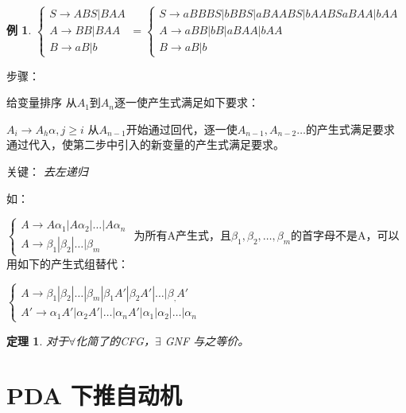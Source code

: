 \documentclass[twocolumn,zihao=5,linespread=1,heading=false,autoindent=0pt]{ctexart}
\theoremstyle{exampstyle} \newtheorem{definition}{定义}[section]
\theoremstyle{exampstyle} \newtheorem{example}{例}[section]
\theoremstyle{exampstyle} \newtheorem{theorem}{定理}[section]
\theoremstyle{exampstyle} \newtheorem{lemma}{引理}[section]
\theoremstyle{exampstyle} \newtheorem{myproof}{证明}[section]
\begin{document}
\begin{example}
    $
        \begin{cases}
            S \to ABS | BAA \\
            A \to BB | BAA \\
            B \to aB | b
        \end{cases} = \begin{cases}
            S \to aBBBS | bBBS | aBAABS | bAABS 
                    aBAA | bAA\\
            A \to aBB | bB | aBAA | bAA \\
            B \to aB | b
        \end{cases}
    $
\end{example}

步骤：
\begin{outline}[cenumerate]
    \1 给变量排序
    \1 从$A_1$到$A_n$逐一使产生式满足如下要求：

    $A_i \to A_h \alpha, j \ge i$
    \1 从$A_{n-1}$开始通过回代，逐一使$A_{n-1},A_{n-2}\dots$的产生式满足要求
    \1 通过代入，使第二步中引入的新变量的产生式满足要求。

    关键： \emph{去左递归}

    如：

    $
    \begin{cases}
        A \to A\alpha_1 | A\alpha_2 | \dots | A\alpha_n \\
        A \to \beta_1 | \beta_2 | \dots | \beta_m
    \end{cases}
    $
    为所有A产生式，且$\beta_1, \beta_2, \dots, \beta_m$的首字母不是A，可以用如下的产生式组替代：
    
    $
    \begin{cases}
        A \to \beta_1 | \beta_2 | \dots | \beta_m | \beta_1 A' | \beta_2 A' | \dots | \beta_, A' \\
        A' \to \alpha_1 A' | \alpha_2 A' | \dots | \alpha_n A' | \alpha_1 | \alpha_2 | \dots | \alpha_n
    \end{cases}
    $
\end{outline}
\begin{theorem}
    对于$\forall$化简了的CFG，$\exists$ GNF 与之等价。
\end{theorem}

\section{PDA 下推自动机}
\end{document}
